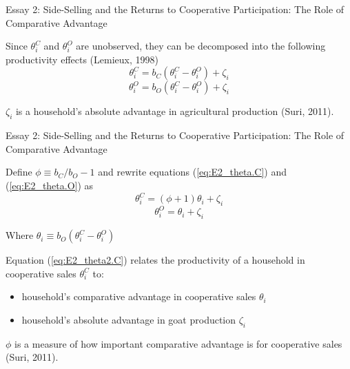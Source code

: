 \documentclass[aspectratio=169]{beamer}
\newenvironment{wideitemize}{\itemize\addtolength{\itemsep}{10pt}}{\enditemize}
\begin{document}
\begin{frame}{Essay 2: Side-Selling and the Returns to Cooperative Participation: The Role of Comparative Advantage}
    \begin{wideitemize}
        \item Since $\theta^{C}_{i}$ and $\theta^{O}_{i}$ are unobserved, they can be decomposed into the following productivity effects (Lemieux, 1998) \vspace{.5cm}
    \end{wideitemize}
    \begin{equation} \label{eq:E2_theta.C}
        \theta^{C}_{i} = b_{C}(\theta^{C}_{i} - \theta^{O}_{i}) + \zeta_{i}
    \end{equation}
    \begin{equation} \label{eq:E2_theta.O}
        \theta^{O}_{i} = b_{O}(\theta^{C}_{i} - \theta^{O}_{i}) + \zeta_{i}
    \end{equation}
    \begin{wideitemize}
        \item $\zeta_{i}$ is a household’s absolute advantage in agricultural production (Suri, 2011). 
    \end{wideitemize}
\end{frame}

\begin{frame}{Essay 2: Side-Selling and the Returns to Cooperative Participation: The Role of Comparative Advantage}
    \begin{wideitemize}
        \item Define $\phi \equiv b_C / b_O - 1$ and rewrite equations (\ref{eq:E2_theta.C}) and (\ref{eq:E2_theta.O}) as \vspace{.5cm}
    \end{wideitemize}
    \begin{equation} \label{eq:E2_theta2.C}
        \theta^{C}_{i} = (\phi + 1)\theta_{i} + \zeta_i
    \end{equation}
    \begin{equation} \label{eq:E2_theta2.O}
        \theta^{O}_{i} = \theta_{i} + \zeta_i
    \end{equation}
    \begin{wideitemize}
        \item Where $\theta_{i} \equiv b_{O}(\theta^{C}_{i} - \theta^{O}_{i})$
        \item Equation (\ref{eq:E2_theta2.C}) relates the productivity of a household in cooperative sales $\theta^{C}_{i}$ to:
        \begin{itemize}
            \item household’s comparative advantage in cooperative sales $\theta_{i}$
            \item household’s absolute advantage in goat production $\zeta_i$
        \end{itemize} 
        \item $\phi$ is a measure of how important comparative advantage is for cooperative sales (Suri, 2011).
    \end{wideitemize}
\end{frame}
\end{document}
